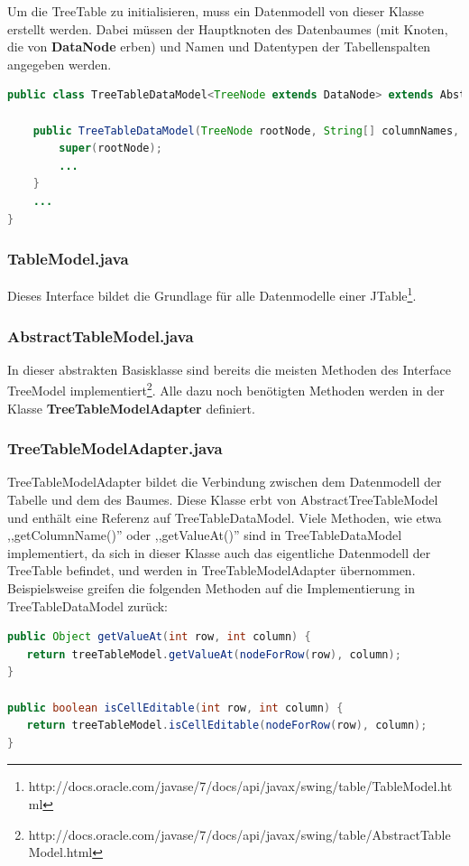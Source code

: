 Um die TreeTable zu initialisieren, muss ein Datenmodell von dieser Klasse erstellt werden. Dabei müssen der Hauptknoten des Datenbaumes (mit Knoten, die von \textbf{DataNode} erben) und Namen und Datentypen der Tabellenspalten angegeben werden.
\begin{lstlisting}[language=JAVA]
public class TreeTableDataModel<TreeNode extends DataNode> extends AbstractTreeTableModel<TreeNode> {

	public TreeTableDataModel(TreeNode rootNode, String[] columnNames, Class<?>[] columnTypes, int currFunc) {
		super(rootNode);
		...
    }
    ...
}
\end{lstlisting}

\subsubsection*{TableModel.java}
Dieses Interface bildet die Grundlage für alle Datenmodelle einer JTable\footnote{http://docs.oracle.com/javase/7/docs/api/javax/swing/table/TableModel.html}.

\subsubsection*{AbstractTableModel.java}
In dieser abstrakten Basisklasse sind bereits die meisten Methoden des Interface TreeModel implementiert\footnote{http://docs.oracle.com/javase/7/docs/api/javax/swing/table/AbstractTableModel.html}. Alle dazu noch benötigten Methoden werden in der Klasse \textbf{TreeTableModelAdapter} definiert.

\subsubsection*{TreeTableModelAdapter.java}
TreeTableModelAdapter bildet die Verbindung zwischen dem Datenmodell der Tabelle und dem des Baumes. Diese Klasse erbt von AbstractTreeTableModel und enthält eine Referenz auf TreeTableDataModel. Viele Methoden, wie etwa ,,getColumnName()'' oder ,,getValueAt()'' sind in TreeTableDataModel implementiert, da sich in dieser Klasse auch das eigentliche Datenmodell der TreeTable befindet, und werden in TreeTableModelAdapter übernommen. Beispielsweise greifen die folgenden Methoden auf die Implementierung in TreeTableDataModel zurück:
\begin{lstlisting}[language=JAVA]
public Object getValueAt(int row, int column) {
   return treeTableModel.getValueAt(nodeForRow(row), column);
}

public boolean isCellEditable(int row, int column) {
   return treeTableModel.isCellEditable(nodeForRow(row), column);
}
\end{lstlisting}

